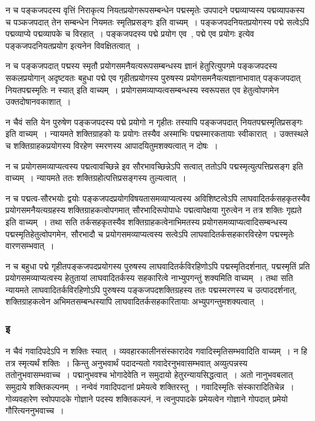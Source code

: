 				न च पङ्कजपदस्य वृत्तिं निराकृत्य नियतप्रयोगरूपसम्बन्धेन पद्मस्मृतेः उपपादने पद्मव्याप्यस्य पद्मव्यापकस्य च पञ्कजपदात् तेन सम्बन्धेन नियमतः स्मृतिप्रसङ्गः इति वाच्यम्~।  पङ्कजपदनियतप्रयोगस्य पद्मे सत्वेऽपि  पद्मव्याप्ये पद्मव्यापके च विरहात्~।  पङ्कजपदस्य पद्मे प्रयोग एव~, पद्मे एव प्रयोगः  इत्येव पङ्कजपदनियतप्रयोग इत्यनेन विवक्षितत्वात्~। 
	
				न च पङ्कजपदात् पद्मस्य स्मृतौ प्रयोगसमनैयत्यरूपसम्बन्धस्य ज्ञानं हेतुरित्युपगमे  पङ्कजपदस्य सकलप्रयोगान् अदृष्टवतः बहुधा पद्मे एव गृहीतप्रयोगस्य पुरुषस्य प्रयोगसमनैयत्यज्ञानाभावात् पङ्कजपदात् नियतपद्मस्मृतिः न स्यात्  इति वाच्यम्~। प्रयोगसमव्याप्यत्वसम्बन्धस्य स्वरूपसत एव  हेतुत्वोपगमेन उक्तदोषानवकाशात्~। 

				न चैवं सति येन पुरुषेण पङ्कजपदस्य पद्मे प्रयोगो न गृहीतः तस्यापि पङ्कजपदात् नियतपद्मस्मृतिप्रसङ्गः इति वाच्यम्~।  न्यायमते शक्तिग्राहको यः प्रयोगः तस्यैव अस्माभिः पद्मस्मारकतायाः स्वीकारात्~।  उक्तस्थले च शक्तिग्राहकप्रयोगस्य  विरहेण स्मरणस्य आपादयितुमशक्यत्वात् न दोषः~। 

				न च प्रयोगसमव्याप्यत्वस्य पद्मत्वावच्छिन्ने इव सौरभावच्छिन्नेऽपि सत्वात् ततोऽपि पद्मस्मृत्युत्पत्तिप्रसङ्ग इति वाच्यम्~।  न्यायमते ततः शक्तिग्रहोत्पत्तिप्रसङ्गस्य तुल्यत्वात्~। 

				न च पद्मत्व-सौरभयोः द्वयोः पङ्कजपदप्रयोगविषयतासमव्याप्यत्वस्य अविशिष्टत्वेऽपि लाघवादितर्कसहकृतस्यैव प्रयोगसमनैयत्यग्रहस्य शक्तिग्राहकत्वोपगमात् सौरभादिरूपोपाधेः पद्मत्वापेक्षया गुरुत्वेन न तत्र शक्तिः गृह्यते  इति वाच्यम्~।  तथा सति तर्कसहकृतस्यैव शक्तिग्राहकत्वेनाभिमतस्य प्रयोगसमव्याप्यत्वादिसम्बन्धस्य पद्मस्मृतिहेतुत्वोपगमेन, सौरभादौ च प्रयोगसमव्याप्यत्वस्य सत्वेऽपि लाघवादितर्कसहकारविरहेण पद्मस्मृतेः वारणसम्भवात्~।
				
				न च बहुधा पद्मे गृहीतपङ्कजपदप्रयोगस्य पुरुषस्य  लाघवादितर्कविरहिणोऽपि पद्मस्मृतिदर्शनात्, पद्मस्मृतिं प्रति प्रयोगसमव्याप्यत्वस्य हेतुतायां लाघवादितर्कस्य सहकारित्वे नाभ्युपगन्तुं शक्यमिति वाच्यम्~। तथा सति न्यायमते लाघवादितर्कविरहिणोऽपि पुरुषस्य  पङ्कजपदशक्तिग्रहस्य  ततः पद्मस्मरणस्य च उत्पाददर्शनात्, शक्तिग्राहकत्वेन अभिमतसम्बन्धस्यापि  लाघवादितर्कसहकारितायाः अभ्युपगन्तुमशक्यत्वात्~।

			\subsubsection{इ}

				\begin{small}

					न चैवं गवादिपदेऽपि न शक्तिः स्यात्~। व्यवहारकालीनसंस्कारादेव गवादिस्मृतिसम्भवादिति वाच्यम्~। न हि तत्र स्मृत्यर्थं शक्तिः~। किन्तु अनुभवार्थं पदादन्यतो गवादेरनुभवासम्भवात् अव्युत्पन्नस्य ततोनुभवासम्भवाच्च~। पद्मानुभवश्च भोगादेवेति न समुदायो हेतुरन्यायसिद्धत्वात्~। अतो नानुभवबलात् समुदाये शक्तिकल्पनम्~। नन्वेवं गवादिपदानां प्रमेयत्वे शक्तिरस्तु~। गवादिस्मृतिः संस्कारादितिचेन्न~। गोव्यवहारेण स्वोपपादके गोज्ञाने पदस्य शक्तिकल्पनं, न त्वनुपपादके प्रमेयत्वेन गोज्ञाने गोपदात् प्रमेयो गौरित्यननुभवाच्च~। 
				\end{small}
					
